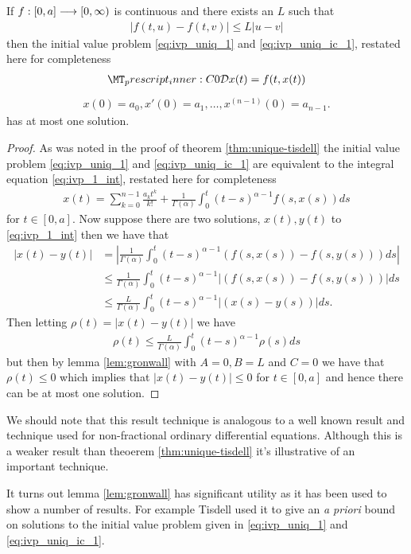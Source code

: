 \begin{mdframed}[innertopmargin=10pt]
\begin{lemma}
	If $ f: [0,a] \longrightarrow [0, \infty) $ is continuous and there exists an $ L $ such that
	\begin{align}
	    |f(t,u) - f(t,v)| \leq L|u-v| 
	\end{align}  
	then the initial value problem \eqref{eq:ivp_uniq_1} and \eqref{eq:ivp_uniq_ic_1}, restated here for completeness
	\begin{align*}   
        \prescript{C}{0}{\mathcal{D}}x(t) = f(t,x(t))
    \end{align*}
    \begin{align*}
        x(0) = a_0, x'(0) = a_1, \ldots, x^{(n-1)}(0) = a_{n-1}.
    \end{align*}
    has at most one solution.
\end{lemma}
\end{mdframed}
\begin{proof}
	As was noted in the proof of theorem \ref{thm:unique-tisdell} the initial value problem \eqref{eq:ivp_uniq_1} and \eqref{eq:ivp_uniq_ic_1} are equivalent to the integral equation \eqref{eq:ivp_1_int}, restated here for completeness
	\begin{align}
		x(t) = \sum_{k=0}^{n-1} \frac{a_k t^k}{k!} + \frac{1}{\Gamma(\alpha)} \int_0^t (t-s)^{\alpha-1}f(s,x(s))ds
	\end{align}
	for $ t \in [0,a] $.
	Now suppose there are two solutions, $ x(t), y(t) $ to \eqref{eq:ivp_1_int} then we have that
	\begin{align*}
		|x(t) - y(t)| &= \left| \frac{1}{\Gamma(\alpha)} \int_0^t (t-s)^{\alpha-1}(f(s,x(s)) - f(s,y(s)))ds \right| \\
			&\leq \frac{1}{\Gamma(\alpha)} \int_0^t (t-s)^{\alpha-1}\left| (f(s,x(s)) - f(s,y(s))) \right|ds \\
			&\leq \frac{L}{\Gamma(\alpha)} \int_0^t (t-s)^{\alpha-1}\left| (x(s) - y(s)) \right|ds.
	\end{align*}
	Then letting $ \rho(t) = |x(t) - y(t)| $
	we have 
	\begin{align*}
		\rho(t) \leq \frac{L}{\Gamma(\alpha)} \int_0^t (t-s)^{\alpha-1}\rho(s)ds
	\end{align*}
	but then by lemma \ref{lem:gronwall} with $ A = 0, B = L $ and $ C = 0 $
	we have that $ \rho(t) \leq 0 $ which implies that $ |x(t) - y(t)| \leq 0 $ for $ t \in [0,a] $ and hence there can be at most one solution.
\end{proof}
	
We should note that this result technique is analogous to a well known result and technique used for non-fractional ordinary differential equations. Although this is a weaker result than theoerem \ref{thm:unique-tisdell} it's illustrative of an important technique. 

It turns out lemma \ref{lem:gronwall} has significant utility as it has been used to show a number of results. For example Tisdell \cite{Tisdell2012} used it to give an \emph{a priori} bound on solutions to the initial value problem given in \eqref{eq:ivp_uniq_1} and \eqref{eq:ivp_uniq_ic_1}.

\clearpage

